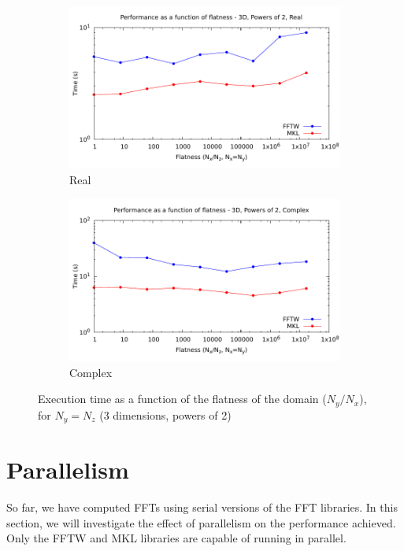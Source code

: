 \documentclass[12pt, a4paper]{article} \setlength{\textheight}{24cm}
\begin{document}
\begin{figure}[H]
  \captionsetup{width=0.8\linewidth}
  \centering
  \begin{subfigure}{.5\textwidth}
    \centering
    \includegraphics[width=.9\linewidth]{graphs/flatness-r.pdf}
    \caption{Real}
    \label{FLATNESSR}
  \end{subfigure}%
  \begin{subfigure}{.5\textwidth}
    \centering
    \includegraphics[width=.9\linewidth]{graphs/flatness-c.pdf}
    \caption{Complex}
    \label{FLATNESSC}
  \end{subfigure}
  \caption{Execution time as a function of the flatness of the domain
    ($N_y/N_x$), for $N_y=N_z$ (3 dimensions, powers of 2)}
  \label{FLATNESS}
\end{figure}

\section{Parallelism}\label{PARALLELISM}
So far, we have computed FFTs using serial versions of the FFT libraries. 
In this section, we
will investigate the effect of parallelism on the performance
achieved. Only the FFTW and MKL libraries are capable of running in
parallel.
\end{document}
